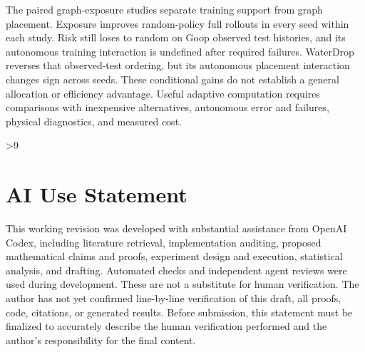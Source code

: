 The paired graph-exposure studies separate training support from graph placement. Exposure improves random-policy full rollouts in every seed within each study. Risk still loses to random on Goop observed test histories, and its autonomous training interaction is undefined after required failures. WaterDrop reverses that observed-test ordering, but its autonomous placement interaction changes sign across seeds. These conditional gains do not establish a general allocation or efficiency advantage. Useful adaptive computation requires comparisons with inexpensive alternatives, autonomous error and failures, physical diagnostics, and measured cost.

\clearpage
{}
\ifnum\value{page}>9
  \PackageError{research-revision}{Main text exceeds the eight-page limit}{Shorten the main text before submission.}
\fi
\section*{AI Use Statement}
This working revision was developed with substantial assistance from OpenAI Codex, including literature retrieval, implementation auditing, proposed mathematical claims and proofs, experiment design and execution, statistical analysis, and drafting. Automated checks and independent agent reviews were used during development. These are not a substitute for human verification. The author has not yet confirmed line-by-line verification of this draft, all proofs, code, citations, or generated results. Before submission, this statement must be finalized to accurately describe the human verification performed and the author's responsibility for the final content.

